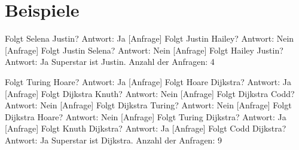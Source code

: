 \documentclass[a4paper, notitlepage, 12pt]{scrartcl}
\begin{document}
\section{Beispiele}
 \begin{MyVerbatim}
 [Anfrage] Folgt Selena Justin? Antwort: Ja
 [Anfrage] Folgt Justin Hailey? Antwort: Nein
 [Anfrage] Folgt Justin Selena? Antwort: Nein
 [Anfrage] Folgt Hailey Justin? Antwort: Ja
 Superstar ist Justin.
 Anzahl der Anfragen: 4
 \end{MyVerbatim}


  \begin{MyVerbatim}
[Anfrage] Folgt Turing Hoare? Antwort: Ja
[Anfrage] Folgt Hoare Dijkstra? Antwort: Ja
[Anfrage] Folgt Dijkstra Knuth? Antwort: Nein
[Anfrage] Folgt Dijkstra Codd? Antwort: Nein
[Anfrage] Folgt Dijkstra Turing? Antwort: Nein
[Anfrage] Folgt Dijkstra Hoare? Antwort: Nein
[Anfrage] Folgt Turing Dijkstra? Antwort: Ja
[Anfrage] Folgt Knuth Dijkstra? Antwort: Ja
[Anfrage] Folgt Codd Dijkstra? Antwort: Ja
Superstar ist Dijkstra.
Anzahl der Anfragen: 9
  \end{MyVerbatim}

\end{document}

